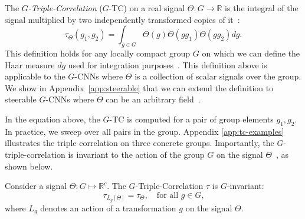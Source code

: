 The \textit{$G$-Triple-Correlation} ($G$-TC) on a real signal $\Theta: G \rightarrow \mathbb{R}$ is the integral of the signal multiplied by two independently transformed copies of it~\cite{kakarala1992triple}:
\begin{equation}
    \tau_\Theta(g_1, g_2)
        = \int_{g \in G} \Theta(g) \Theta\left(g g_1\right) \Theta\left(g g_2\right)dg .
\end{equation}
This definition holds for any locally compact group $G$ on which we can define the Haar measure $dg$ used for integration purposes~\cite{KakaralaTriple}. This definition above is applicable to the $G$-CNNs where $\Theta$ is a collection of scalar signals over the group. We show in Appendix~\ref{app:steerable} that we can extend the definition to steerable $G$-CNNs where $\Theta$ can be an arbitrary field~\cite{cohen2016steerable}.

In the equation above, the $G$-TC is computed for a pair of group elements $g_1, g_2$. In practice, we sweep over all pairs in the group. Appendix \ref{app:tc-examples} illustrates the triple correlation on three concrete groups. Importantly, the $G$-triple-correlation is invariant to the action of the group $G$ on the signal $\Theta$~\cite{KakaralaTriple}, as shown below.
\begin{proposition}Consider a signal $\Theta: G \mapsto \mathbb{R}^c$. The $G$-Triple-Correlation $\tau$ is $G$-invariant:
\begin{equation}
    \tau_{L_g[\Theta]} = \tau_{\Theta}, \quad \text{for all $g \in G$,}
\end{equation}
where $L_g$ denotes an action of a transformation $g$ on the signal $\Theta$.
\end{proposition}

